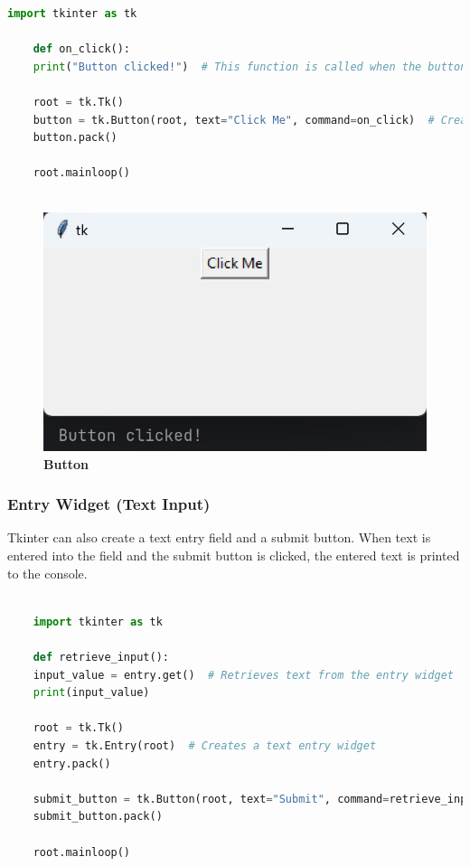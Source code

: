 \begin{lstlisting}[language=Python]
    import tkinter as tk
    
    def on_click():
    print("Button clicked!")  # This function is called when the button is clicked.
    
    root = tk.Tk()
    button = tk.Button(root, text="Click Me", command=on_click)  # Creates a button. 'command' links the button to the on_click function.
    button.pack()
    
    root.mainloop()
    
\end{lstlisting}

\begin{figure}[h!]
    \centering
    \includegraphics[width=\textwidth]{Images/TKinter/ClickMeButton}
    \caption{\textbf{Button}}
\end{figure}

\subsubsection{Entry Widget (Text Input)}

Tkinter can also create a text entry field and a submit button. When text is entered into the field and the submit button is clicked, the entered text is printed to the console.

\begin{lstlisting}[language=Python]
    
    import tkinter as tk
    
    def retrieve_input():
    input_value = entry.get()  # Retrieves text from the entry widget
    print(input_value)
    
    root = tk.Tk()
    entry = tk.Entry(root)  # Creates a text entry widget
    entry.pack()
    
    submit_button = tk.Button(root, text="Submit", command=retrieve_input)  # Button to trigger text retrieval
    submit_button.pack()
    
    root.mainloop()
    
\end{lstlisting}

